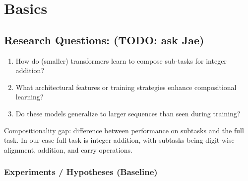 \chapter{Basics}\label{basics}

\section*{Research Questions: (TODO: ask Jae)}

\begin{enumerate}
    \item How do (smaller) transformers learn to compose sub-tasks for integer addition?
    \item What architectural features or training strategies enhance compositional learning?
    \item Do these models generalize to larger sequences than seen during training?
\end{enumerate}

Compositionality gap: difference between performance on subtasks and the full task. In our case full task is integer addition, with subtasks being digit-wise alignment, addition, and carry operations.

\subsection*{Experiments / Hypotheses (Baseline)}

